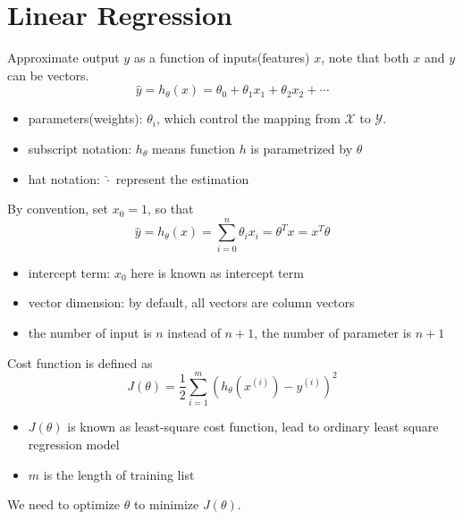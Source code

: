 \documentclass[10pt,a4paper,oneside]{article}
\begin{document}
\newpage
\section{Linear Regression}
Approximate output $y$ as a function of inputs(features) $x$, note that both $x$ and $y$ can be vectors.
\[
\hat{y} = h_\theta(x) = \theta_0 + \theta_1 x_1 + \theta_2 x_2 + \cdots
\]
\begin{itemize}
	\item parameters(weights): $\theta_i$, which control the mapping from $\mathcal{X}$ to $\mathcal{Y}$.
	\item subscript notation: $h_\theta$ means function $h$ is parametrized by $\theta$
	\item hat notation: $\hat{\cdot}$ represent the estimation
\end{itemize}
By convention, set $x_0 = 1$, so that
\[
\hat{y} = h_\theta (x) = \sum_{i=0}^{n} \theta_i x_i = \theta^T x = x^T \theta
\] 
\begin{itemize}
	\item intercept term: $x_0$ here is known as intercept term
	\item vector dimension: by default, all vectors are column vectors
	\item the number of input is $n$ instead of $n+1$, the number of parameter is $n+1$
\end{itemize}
Cost function is defined as
\[
J(\theta) = \frac{1}{2} \sum_{i=1}^{m} (h_\theta(x^{(i)}) - y^{(i)})^2
\]
\begin{itemize}
	\item $J(\theta)$ is known as least-square cost function, lead to ordinary least square regression model
	\item  $m$ is the length of training list
\end{itemize}
We need to optimize $\theta$ to minimize $J(\theta)$.
\end{document}
